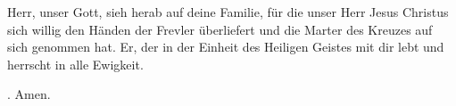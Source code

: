 \lettrine[lines=3]{H}{}err, unser Gott, sieh herab auf deine Familie, für die unser Herr Jesus Christus sich willig den Händen der Frevler überliefert und die Marter des Kreuzes auf sich genommen hat. Er, der in der Einheit des Heiligen Geistes mit dir lebt und herrscht in alle Ewigkeit.
\par \Rbar. Amen.